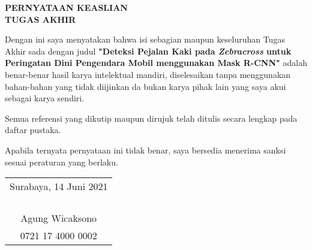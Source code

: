 \begin{center}
  \large
  \textbf{PERNYATAAN KEASLIAN\\TUGAS AKHIR}
\end{center}

\thispagestyle{empty}

\vspace{2ex}


Dengan ini saya menyatakan bahwa isi sebagian maupun keseluruhan Tugas Akhir sada dengan judul \textbf{"Deteksi Pejalan Kaki pada \textit{Zebracross} untuk Peringatan Dini Pengendara Mobil menggunakan Mask R-CNN"} adalah benar-benar hasil karya intelektual mandiri, diselesaikan tanpa menggunakan bahan-bahan yang tidak diijinkan da bukan karya pihak lain yang saya akui sebagai karya sendiri.

Semua referensi yang dikutip maupun dirujuk telah ditulis secara lengkap pada daftar pustaka.

Apabila ternyata pernyataan ini tidak benar, saya bersedia menerima sanksi sesuai peraturan yang berlaku.

\vspace{4ex}

\begin{flushright}
  \begin{tabular}[b]{c}
    Surabaya, 14 Juni 2021\\
    \\
    \\
    \\
    \\
    Agung Wicaksono\\
    0721 17 4000 0002
  \end{tabular}
\end{flushright}
